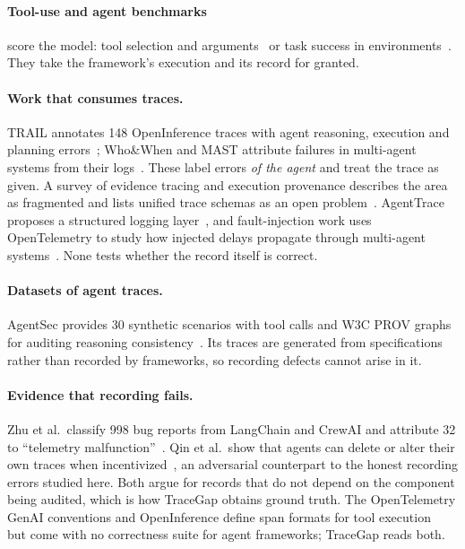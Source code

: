 \documentclass[10pt]{article}
\begin{document}
\paragraph{Tool-use and agent benchmarks} score the model: tool selection and arguments~\citep{patil2023gorilla,qin2024toolllm} or task success in environments~\citep{yao2024tau,liu2024agentbench}. They take the framework's execution and its record for granted.

\paragraph{Work that consumes traces.} TRAIL annotates 148 OpenInference traces with agent reasoning, execution and planning errors~\citep{deshpande2025trail}; Who\&When and MAST attribute failures in multi-agent systems from their logs~\citep{zhang2025whowhen,cemri2025mast}. These label errors \emph{of the agent} and treat the trace as given. A survey of evidence tracing and execution provenance describes the area as fragmented and lists unified trace schemas as an open problem~\citep{wang2026survey}. AgentTrace proposes a structured logging layer~\citep{alsayyad2026agenttrace}, and fault-injection work uses OpenTelemetry to study how injected delays propagate through multi-agent systems~\citep{seyedghorban2026fault}. None tests whether the record itself is correct.

\paragraph{Datasets of agent traces.} AgentSec provides 30 synthetic scenarios with tool calls and W3C PROV graphs for auditing reasoning consistency~\citep{hmimou2026agentsec}. Its traces are generated from specifications rather than recorded by frameworks, so recording defects cannot arise in it.

\paragraph{Evidence that recording fails.} Zhu et al.\ classify 998 bug reports from LangChain and CrewAI and attribute 32 to ``telemetry malfunction''~\citep{zhu2026bugs}. Qin et al.\ show that agents can delete or alter their own traces when incentivized~\citep{qin2026tamper}, an adversarial counterpart to the honest recording errors studied here. Both argue for records that do not depend on the component being audited, which is how TraceGap obtains ground truth. The OpenTelemetry GenAI conventions and OpenInference define span formats for tool execution~\citep{otel2026genai,openinference2026} but come with no correctness suite for agent frameworks; TraceGap reads both.
\end{document}
